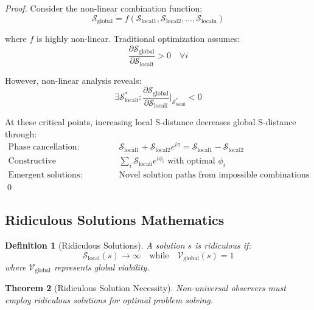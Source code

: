 \documentclass[12pt,a4paper]{article}
\newtheorem{theorem}{Theorem}[section]
\newtheorem{definition}[theorem]{Definition}
\begin{document}
\begin{proof}
Consider the non-linear combination function:
\begin{equation}
\mathcal{S}_{\text{global}} = f(\mathcal{S}_{\text{local1}}, \mathcal{S}_{\text{local2}}, \ldots, \mathcal{S}_{\text{localn}})
\end{equation}

where $f$ is highly non-linear. Traditional optimization assumes:
\begin{equation}
\frac{\partial \mathcal{S}_{\text{global}}}{\partial \mathcal{S}_{\text{locali}}} > 0 \quad \forall i
\end{equation}

However, non-linear analysis reveals:
\begin{equation}
\exists \mathcal{S}_{\text{locali}}^* : \frac{\partial \mathcal{S}_{\text{global}}}{\partial \mathcal{S}_{\text{locali}}}\bigg|_{\mathcal{S}_{\text{locali}}^*} < 0
\end{equation}

At these critical points, increasing local S-distance decreases global S-distance through:
\begin{align}
\text{Phase cancellation:} & \quad \mathcal{S}_{\text{local1}} + \mathcal{S}_{\text{local2}} e^{i\pi} = \mathcal{S}_{\text{local1}} - \mathcal{S}_{\text{local2}} \\
\text{Constructive interference:} & \quad \sum_{i} \mathcal{S}_{\text{locali}} e^{i\phi_i} \text{ with optimal } \phi_i \\
\text{Emergent solutions:} & \quad \text{Novel solution paths from impossible combinations}
\end{align}
\qed
\end{proof}

\subsection{Ridiculous Solutions Mathematics}

\begin{definition}[Ridiculous Solutions]
A solution $s$ is ridiculous if:
\begin{equation}
\mathcal{S}_{\text{local}}(s) \to \infty \quad \text{while} \quad \mathcal{V}_{\text{global}}(s) = 1
\end{equation}
where $\mathcal{V}_{\text{global}}$ represents global viability.
\end{definition}

\begin{theorem}[Ridiculous Solution Necessity]
Non-universal observers must employ ridiculous solutions for optimal problem solving.
\end{theorem}
\end{document}
